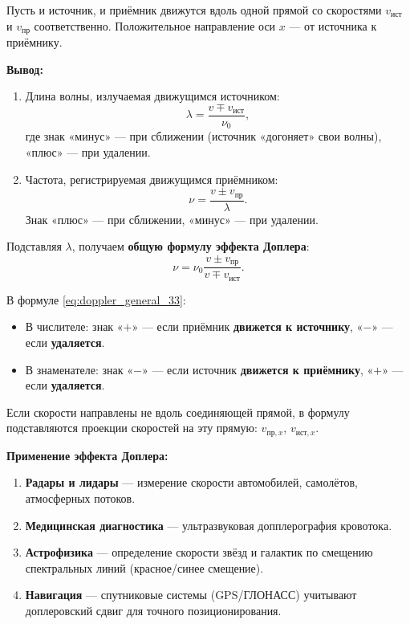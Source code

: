 \begin{theorem}
Пусть и источник, и приёмник движутся вдоль одной прямой со скоростями $v_{\text{ист}}$ и $v_{\text{пр}}$ соответственно. Положительное направление оси $x$ --- от источника к приёмнику.

\textbf{Вывод:}
\begin{enumerate}
    \item Длина волны, излучаемая движущимся источником:
    \begin{equation}
        \lambda = \frac{v \mp v_{\text{ист}}}{\nu_0},
    \end{equation}
    где знак «минус» --- при сближении (источник «догоняет» свои волны), «плюс» --- при удалении.
    \item Частота, регистрируемая движущимся приёмником:
    \begin{equation}
        \nu = \frac{v \pm v_{\text{пр}}}{\lambda}.
    \end{equation}
    Знак «плюс» --- при сближении, «минус» --- при удалении.
\end{enumerate}
Подставляя $\lambda$, получаем \textbf{общую формулу эффекта Доплера}:
\begin{equation}
    \nu = \nu_0 \frac{v \pm v_{\text{пр}}}{v \mp v_{\text{ист}}}. \label{eq:doppler_general_33}
\end{equation}
\end{theorem}

\begin{property}
В формуле \eqref{eq:doppler_general_33}:
\begin{itemize}
    \item В числителе: знак «$+$» --- если приёмник \textbf{движется к источнику}, «$-$» --- если \textbf{удаляется}.
    \item В знаменателе: знак «$-$» --- если источник \textbf{движется к приёмнику}, «$+$» --- если \textbf{удаляется}.
\end{itemize}
Если скорости направлены не вдоль соединяющей прямой, в формулу подставляются проекции скоростей на эту прямую: $v_{\text{пр},x}$, $v_{\text{ист},x}$.
\end{property}

\begin{remark}
\textbf{Применение эффекта Доплера:}
\begin{enumerate}
    \item \textbf{Радары и лидары} --- измерение скорости автомобилей, самолётов, атмосферных потоков.
    \item \textbf{Медицинская диагностика} --- ультразвуковая допплерография кровотока.
    \item \textbf{Астрофизика} --- определение скорости звёзд и галактик по смещению спектральных линий (красное/синее смещение).
    \item \textbf{Навигация} --- спутниковые системы (GPS/ГЛОНАСС) учитывают доплеровский сдвиг для точного позиционирования.
\end{enumerate}
\end{remark}
